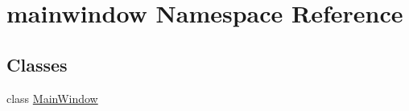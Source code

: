 \hypertarget{namespacemainwindow}{}\section{mainwindow Namespace Reference}
\label{namespacemainwindow}
\subsection*{Classes}
\begin{DoxyCompactItemize}
\item 
class \hyperlink{classmainwindow_1_1MainWindow}{Main\+Window}
\end{DoxyCompactItemize}
